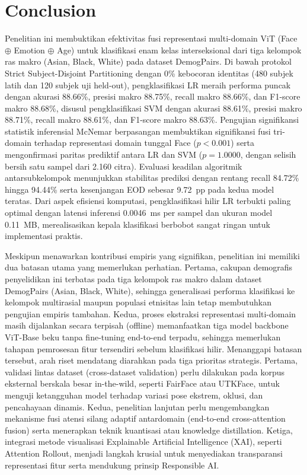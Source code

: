 \section{Conclusion}
\label{sec:conclusion}

Penelitian ini membuktikan efektivitas fusi representasi multi-domain ViT (Face $\oplus$ Emotion $\oplus$ Age) untuk klasifikasi enam kelas interseksional dari tiga kelompok ras makro (Asian, Black, White) pada dataset DemogPairs. Di bawah protokol Strict Subject-Disjoint Partitioning dengan 0\% kebocoran identitas (480 subjek latih dan 120 subjek uji held-out), pengklasifikasi LR meraih performa puncak dengan akurasi 88.66\%, presisi makro 88.75\%, recall makro 88.66\%, dan F1-score makro 88.68\%, disusul pengklasifikasi SVM dengan akurasi 88.61\%, presisi makro 88.71\%, recall makro 88.61\%, dan F1-score makro 88.63\%. Pengujian signifikansi statistik inferensial McNemar berpasangan membuktikan signifikansi fusi tri-domain terhadap representasi domain tunggal Face ($p < 0.001$) serta mengonfirmasi paritas prediktif antara LR dan SVM ($p = 1.0000$, dengan selisih bersih satu sampel dari 2.160 citra). Evaluasi keadilan algoritmik antarsubkelompok menunjukkan stabilitas prediksi dengan rentang recall 84.72\% hingga 94.44\% serta kesenjangan EOD sebesar 9.72~pp pada kedua model teratas. Dari aspek efisiensi komputasi, pengklasifikasi hilir LR terbukti paling optimal dengan latensi inferensi 0.0046~ms per sampel dan ukuran model 0.11~MB, merealisasikan kepala klasifikasi berbobot sangat ringan untuk implementasi praktis.

Meskipun menawarkan kontribusi empiris yang signifikan, penelitian ini memiliki dua batasan utama yang memerlukan perhatian. Pertama, cakupan demografis penyelidikan ini terbatas pada tiga kelompok ras makro dalam dataset DemogPairs (Asian, Black, White), sehingga generalisasi performa klasifikasi ke kelompok multirasial maupun populasi etnisitas lain tetap membutuhkan pengujian empiris tambahan. Kedua, proses ekstraksi representasi multi-domain masih dijalankan secara terpisah (offline) memanfaatkan tiga model backbone ViT-Base beku tanpa fine-tuning end-to-end terpadu, sehingga memerlukan tahapan pemrosesan fitur tersendiri sebelum klasifikasi hilir. Menanggapi batasan tersebut, arah riset mendatang diarahkan pada tiga prioritas strategis. Pertama, validasi lintas dataset (cross-dataset validation) perlu dilakukan pada korpus eksternal berskala besar in-the-wild, seperti FairFace atau UTKFace, untuk menguji ketangguhan model terhadap variasi pose ekstrem, oklusi, dan pencahayaan dinamis. Kedua, penelitian lanjutan perlu mengembangkan mekanisme fusi atensi silang adaptif antardomain (end-to-end cross-attention fusion) serta menerapkan teknik kuantisasi atau knowledge distillation. Ketiga, integrasi metode visualisasi Explainable Artificial Intelligence (XAI), seperti Attention Rollout, menjadi langkah krusial untuk menyediakan transparansi representasi fitur serta mendukung prinsip Responsible AI.

